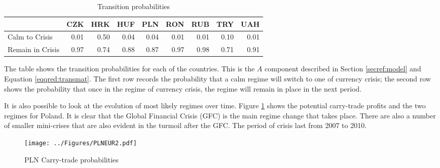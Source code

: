 \documentclass[12pt, a4paper, oneside]{article}\usepackage[]{graphicx}\usepackage[]{color}
\begin{document}
\begin{table}[t]
\begin{threeparttable}
\centering
\begin{tabular}{p{3cm}rrrrrrrr}
  \hline
& CZK & HRK & HUF & PLN & RON & RUB & TRY & UAH\\ 
  \hline
Calm to Crisis & 0.01 & 0.50 & 0.04 & 0.04 & 0.01 & 0.01 & 0.10 & 0.01\\
Remain in Crisis & 0.97 & 0.74 & 0.88 & 0.87 & 0.97 & 0.98 & 0.71 & 0.91 \\
  \hline
\end{tabular}
\begin{tablenotes}
\small
\item  The table shows the transition probabilities for each of the countries.  This is the $A$ component described in Section \ref{secref:model} and Equation \ref{eqqred:transmat}. The first row records the probability that a calm regime will switch to one of currency crisis; the second row shows the probability that once in the regime of currency crisis, the regime will remain in place in the next period. 
\end{tablenotes}
\caption{Transition probabilities}
\label{tabref:transprob}
\end{threeparttable}
\end{table}

It is also possible to look at the evolution of most likely regimes over time.  Figure \ref{figref:pln} shows the potential carry-trade profits and the two regimes for Poland.  It is clear that the Global Financial Crisis (GFC) is the main regime change that takes place.  There are also a number of smaller mini-crises that are also evident in the turmoil after the GFC. The period of crisis last from 2007 to 2010. 

\begin{figure}[ht]
\centering
\texttt{[image: ../Figures/PLNEUR2.pdf]}
\caption{PLN Carry-trade probabilities}
\label{figref:pln}
\end{figure}
\end{document}
